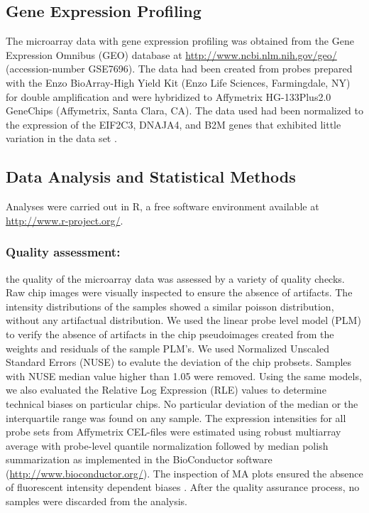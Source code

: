 \documentclass[9pt,twocolumn,twoside]{gsajnl}
\begin{document}
\subsection*{Gene Expression Profiling}

The microarray data with gene expression profiling was obtained from the Gene Expression Omnibus (GEO) database at \url{http://www.ncbi.nlm.nih.gov/geo/} (accession-number GSE7696). The data had been created from probes prepared with the Enzo BioArray-High Yield Kit (Enzo Life Sciences, Farmingdale, NY) for double amplification and were hybridized to Affymetrix HG-133Plus2.0 GeneChips (Affymetrix, Santa Clara, CA). The data used had been normalized to the expression of the EIF2C3, DNAJA4, and B2M genes that exhibited little variation in the data set \citep{Murat2008}.

\subsection*{Data Analysis and Statistical Methods}
Analyses were carried out in R, a free software environment available at \url{http://www.r-project.org/}.

\subsubsection*{Quality assessment:}
the quality of the microarray data was assessed by a variety of quality checks. Raw chip images were visually inspected to ensure the absence of  artifacts. The intensity distributions of the samples showed a similar poisson distribution, without any artifactual distribution. We used the linear probe level model (PLM) \citep{Bolstad2004, Brettschneider2007} to verify the absence of artifacts in the chip pseudoimages created from the weights and residuals of the sample PLM's. We used Normalized Unscaled Standard Errors (NUSE) \citep{Bolstad2004} to evalute the deviation of the chip probsets. Samples with NUSE median value higher than 1.05 were removed. Using the same models, we also evaluated the Relative Log Expression (RLE) values \citep{Bolstad2004, Brettschneider2007} to determine technical biases on particular chips. No particular deviation of the median or the interquartile range was found on any sample. The expression intensities for all probe sets from Affymetrix CEL-files were estimated using robust multiarray average  with probe-level quantile normalization followed by median polish summarization \citep{Irizarry2003} as implemented in the BioConductor software (\url{http://www.bioconductor.org/}). The inspection of MA plots ensured the absence of fluorescent intensity dependent biases \citep{Bolstad2004}. After the quality assurance process, no samples were discarded from the analysis.
\end{document}
